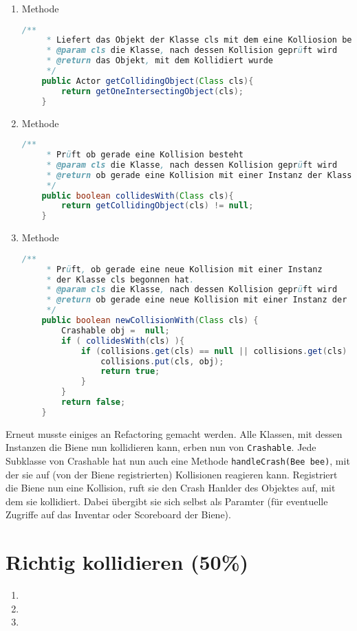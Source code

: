\documentclass{pi1}
\begin{document}
\begin{enumerate}

\item
Methode
\begin{lstlisting}[caption={\emph{getCollidingObject(Class cls)}-Methode}, firstnumber=25, language=Java]
/**
     * Liefert das Objekt der Klasse cls mit dem eine Kolliosion besteht.
     * @param cls die Klasse, nach dessen Kollision geprüft wird
     * @return das Objekt, mit dem Kollidiert wurde
     */
    public Actor getCollidingObject(Class cls){
        return getOneIntersectingObject(cls);
    }
\end{lstlisting}

\item
Methode
\begin{lstlisting}[caption={\emph{collidesWith(Class cls)}-Methode}, firstnumber=25, language=Java]
/**
     * Prüft ob gerade eine Kollision besteht
     * @param cls die Klasse, nach dessen Kollision geprüft wird
     * @return ob gerade eine Kollision mit einer Instanz der Klasse cls besteht
     */
    public boolean collidesWith(Class cls){
        return getCollidingObject(cls) != null;
    }
\end{lstlisting}

\item
Methode
\begin{lstlisting}[caption={\emph{newCollisionWith(Class cls)}-Methode}, firstnumber=25, language=Java]
/**
     * Prüft, ob gerade eine neue Kollision mit einer Instanz
     * der Klasse cls begonnen hat.
     * @param cls die Klasse, nach dessen Kollision geprüft wird
     * @return ob gerade eine neue Kollision mit einer Instanz der Klasse cls begonnen hat
     */
    public boolean newCollisionWith(Class cls) {
        Crashable obj =  null;
        if ( collidesWith(cls) ){
            if (collisions.get(cls) == null || collisions.get(cls) != obj ){
                collisions.put(cls, obj);
                return true;
            }
        } 
        return false;
    }
\end{lstlisting}

\end{enumerate}

Erneut musste einiges an Refactoring gemacht werden. Alle Klassen, mit dessen Instanzen die Biene nun kollidieren kann, erben nun von \texttt{Crashable}. Jede Subklasse von Crashable hat nun auch eine Methode \texttt{handleCrash(Bee bee)}, mit der sie auf (von der Biene registrierten) Kollisionen reagieren kann. Registriert die Biene nun eine Kollision, ruft sie den Crash Hanlder des Objektes auf, mit dem sie kollidiert. Dabei übergibt sie sich selbst als Paramter (für eventuelle Zugriffe auf das Inventar oder Scoreboard der Biene).

\section{Richtig kollidieren (50\%)}



\begin{enumerate}

\item 

\item 

\item 

\end{enumerate}
\end{document}
